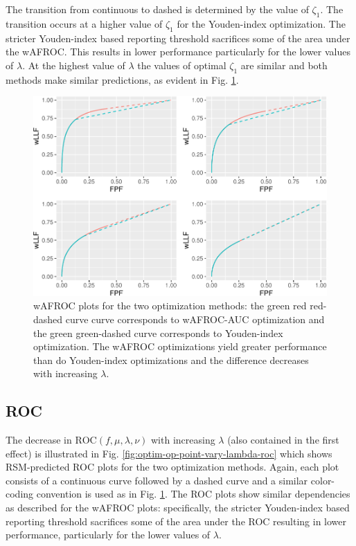 \documentclass[
]{book}
\begin{document}
The transition from continuous to dashed is determined by the value of \(\zeta_1\). The transition occurs at a higher value of \(\zeta_1\) for the Youden-index optimization. The stricter Youden-index based reporting threshold sacrifices some of the area under the wAFROC. This results in lower performance particularly for the lower values of \(\lambda\). At the highest value of \(\lambda\) the values of optimal \(\zeta_1\) are similar and both methods make similar predictions, as evident in Fig. \ref{fig:optim-op-point-vary-lambda-wafroc}.

\begin{figure}
\centering
\includegraphics{21-optim-op-point_files/figure-latex/optim-op-point-vary-lambda-wafroc-1.pdf}
\caption{\label{fig:optim-op-point-vary-lambda-wafroc}wAFROC plots for the two optimization methods: the green red red-dashed curve curve corresponds to wAFROC-AUC optimization and the green green-dashed curve corresponds to Youden-index optimization. The wAFROC optimizations yield greater performance than do Youden-index optimizations and the difference decreases with increasing \(\lambda\).}
\end{figure}

\hypertarget{roc-1}{%
\subsection{ROC}\label{roc-1}}

The decrease in \(\text{ROC} \left ( f, \mu, \lambda, \nu \right )\) with increasing \(\lambda\) (also contained in the first effect) is illustrated in Fig. \ref{fig:optim-op-point-vary-lambda-roc} which shows RSM-predicted ROC plots for the two optimization methods. Again, each plot consists of a continuous curve followed by a dashed curve and a similar color-coding convention is used as in Fig. \ref{fig:optim-op-point-vary-lambda-wafroc}. The ROC plots show similar dependencies as described for the wAFROC plots: specifically, the stricter Youden-index based reporting threshold sacrifices some of the area under the ROC resulting in lower performance, particularly for the lower values of \(\lambda\).
\end{document}
